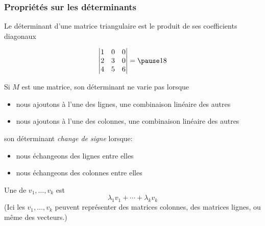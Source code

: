 \subsubsection{Propriétés sur les déterminants}
\begin{frame}
  \begin{proposition}
    Le déterminant d'une matrice triangulaire est le produit de ses coefficients diagonaux
  \end{proposition}\pause{}
  \begin{example}
    \begin{equation*}
      \begin{vmatrix}
        1 & 0 & 0\\
        2 & 3 & 0\\
        4 & 5 & 6
      \end{vmatrix} = \pause 18
    \end{equation*}
  \end{example}
\end{frame}
\begin{frame}Si \(M\) est une matrice, son déterminant ne varie pas lorsque
  \begin{itemize}
  \item nous ajoutons à l'une des lignes, une combinaison linéaire des autres\pause{}
  \item nous ajoutons à l'une des colonnes, une combinaison linéaire des autres
  \end{itemize}\pause{}
  son déterminant \emph{change de signe} lorsque:
  \begin{itemize}
  \item nous échangeons des lignes entre elles
  \item nous échangeons des colonnes entre elles
  \end{itemize}\pause{}
  \begin{definition}
    Une  de \(v_{1}, \ldots, v_{k}\) est
    \begin{equation*}
      \lambda_{1}v_{1} + \cdots + \lambda_{k} v_{k}
    \end{equation*}\pause{}
    (Ici les \(v_{1}, \ldots, v_{k}\) peuvent représenter des matrices colonnes, des matrices lignes, ou même des vecteurs.)
  \end{definition}
\end{frame}
